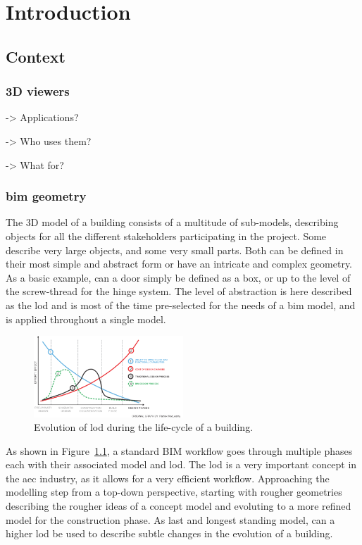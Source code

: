 \chapter{Introduction}
\section{Context}
\subsection{3D viewers}
-> Applications?

-> Who uses them?

-> What for?

\subsection{\acs{bim} geometry} \label{subsec:bimGeometry}

The 3D model of a building consists of a multitude of sub-models, describing objects for all the different stakeholders participating in the project. Some describe very large objects, and some very small parts. Both can be defined in their most simple and abstract form or have an intricate and complex geometry. As a basic example, can a door simply be defined as a box, or up to the level of the screw-thread for the hinge system. The level of abstraction is here described as the \ac{lod} and is most of the time pre-selected for the needs of a \ac{bim} model, and is applied throughout a single model.

\begin{figure}[h]
    \centering
    \includegraphics[width=0.5\textwidth]{figures/BIM grafiek.png}
    \caption{Evolution of \ac{lod} during the life-cycle of a building.}
    \label{fig:bimGraph}
\end{figure}

As shown in Figure~\ref{fig:bimGraph}, a standard BIM workflow goes through multiple phases each with their associated model and \ac{lod}. The \ac{lod} is a very important concept in the \ac{aec} industry, as it allows for a very efficient workflow. Approaching the modelling step from a top-down perspective, starting with rougher geometries describing the rougher ideas of a concept model and evoluting to a more refined model for the construction phase. As last and longest standing model, can a higher \ac{lod} be used to describe subtle changes in the evolution of a building.

